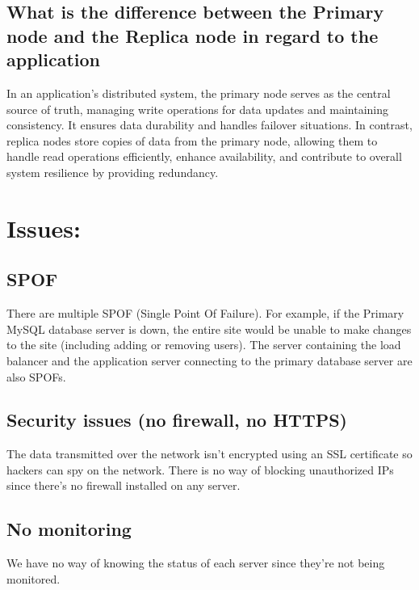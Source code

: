 \documentclass[a4paper, 10pt]{article}
\begin{document}
    \subsection*{What is the difference between the Primary node and the Replica node in regard to the application}
        In an application's distributed system, the primary node serves as the central source of truth, 
        managing write operations for data updates and maintaining consistency. It ensures data durability and handles failover situations. 
        In contrast, replica nodes store copies of data from the primary node, 
        allowing them to handle read operations efficiently, enhance availability, and contribute to overall system resilience by providing redundancy.
\section*{Issues: }
    \subsection*{SPOF}
        There are multiple SPOF (Single Point Of Failure).
        For example, if the Primary MySQL database server is down, 
        the entire site would be unable to make changes to the site (including adding or removing users).
        The server containing the load balancer and the application server connecting to the primary database server are also SPOFs.
    \subsection*{Security issues (no firewall, no HTTPS)}
        The data transmitted over the network isn't encrypted using an SSL certificate so hackers 
        can spy on the network. There is no way of blocking unauthorized IPs since there's no 
        firewall installed on any server.
    \subsection*{No monitoring}
        We have no way of knowing the status of
        each server since they're not being monitored.
\end{document}
